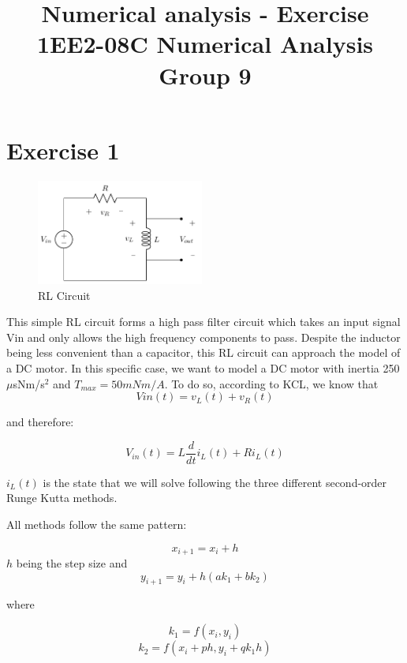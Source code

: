 \documentclass[10pt,a4paper]{article}
\title{Numerical analysis - Exercise 1}
\author{}
\date{}
\begin{document}
\vspace{-20mm}
\title{\textbf{EE2-08C Numerical Analysis} \\ Group 9\vspace{-17mm}}
\maketitle

\section*{Exercise 1}\vspace{-1mm}

\begin{figure}
\vspace{-10mm}
\includegraphics[width=0.49\textwidth]{RL_circuit.png}
\vspace{-6mm}
\caption{RL Circuit}
\label{fig:RL}
\end{figure}

This simple RL circuit forms a high pass filter circuit which takes an input signal Vin and only allows the high frequency components to pass. Despite the inductor being less convenient than a capacitor, this RL circuit can approach the model of a DC motor. In this specific case, we want to model a DC motor with inertia 250 $\mu$sNm/s$^2$ and $T_{max} = 50mNm/A$. To do so, according to KCL, we know that
\[Vin(t) = v_L(t) + v_R(t)\]

and therefore:

\[ V_{in}(t) = L\frac{d}{dt}i_L(t) + R i_L(t) \]

$i_L(t)$ is the state that we will solve following the three different second-order Runge Kutta methods.

All methods follow the same pattern:

\[x_{i+1} = x_i + h\]
$h$ being the step size and
\[y_{i+1} = y_i + h (a k_1 + b k_2)\]

where

\[k_1 = f(x_i, y_i)\]
\[k_2 = f(x_i + p h, y_i + q k_1 h)\]
\end{document}
